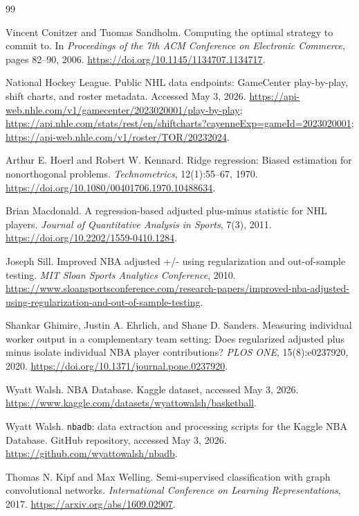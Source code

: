 \documentclass[11pt,letterpaper]{article}
\begin{document}
\begin{thebibliography}{99}

Vincent Conitzer and Tuomas Sandholm.
Computing the optimal strategy to commit to.
In \emph{Proceedings of the 7th ACM Conference on Electronic Commerce},
pages 82--90, 2006.
\url{https://doi.org/10.1145/1134707.1134717}.

National Hockey League.
Public NHL data endpoints: GameCenter play-by-play, shift charts, and roster
metadata. Accessed May 3, 2026.
\url{https://api-web.nhle.com/v1/gamecenter/2023020001/play-by-play};
\url{https://api.nhle.com/stats/rest/en/shiftcharts?cayenneExp=gameId=2023020001};
\url{https://api-web.nhle.com/v1/roster/TOR/20232024}.

Arthur E. Hoerl and Robert W. Kennard.
Ridge regression: Biased estimation for nonorthogonal problems.
\emph{Technometrics}, 12(1):55--67, 1970.
\url{https://doi.org/10.1080/00401706.1970.10488634}.

Brian Macdonald.
A regression-based adjusted plus-minus statistic for NHL players.
\emph{Journal of Quantitative Analysis in Sports}, 7(3), 2011.
\url{https://doi.org/10.2202/1559-0410.1284}.

Joseph Sill.
Improved NBA adjusted +/- using regularization and out-of-sample testing.
\emph{MIT Sloan Sports Analytics Conference}, 2010.
\url{https://www.sloansportsconference.com/research-papers/improved-nba-adjusted-using-regularization-and-out-of-sample-testing}.

Shankar Ghimire, Justin A. Ehrlich, and Shane D. Sanders.
Measuring individual worker output in a complementary team setting: Does
regularized adjusted plus minus isolate individual NBA player contributions?
\emph{PLOS ONE}, 15(8):e0237920, 2020.
\url{https://doi.org/10.1371/journal.pone.0237920}.

Wyatt Walsh.
NBA Database.
Kaggle dataset, accessed May 3, 2026.
\url{https://www.kaggle.com/datasets/wyattowalsh/basketball}.

Wyatt Walsh.
\texttt{nbadb}: data extraction and processing scripts for the Kaggle NBA
Database.
GitHub repository, accessed May 3, 2026.
\url{https://github.com/wyattowalsh/nbadb}.

Thomas N. Kipf and Max Welling.
Semi-supervised classification with graph convolutional networks.
\emph{International Conference on Learning Representations}, 2017.
\url{https://arxiv.org/abs/1609.02907}.


\end{thebibliography}
\end{document}
